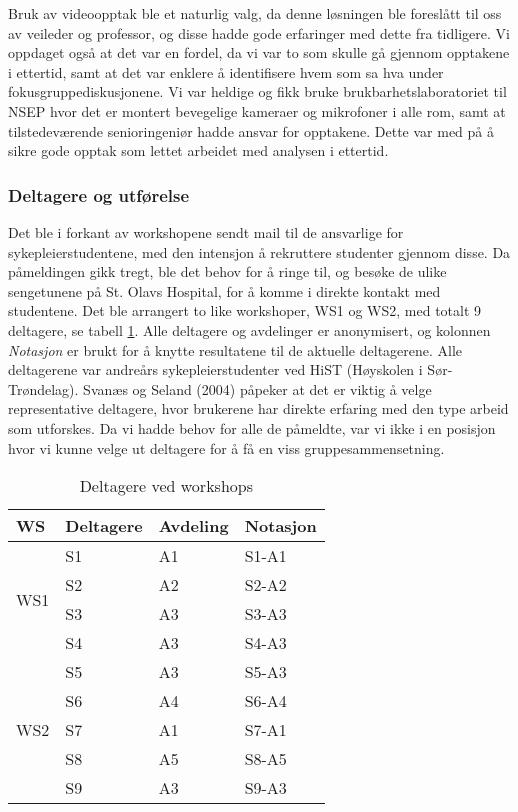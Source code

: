 \noindent
Bruk av videoopptak ble et naturlig valg, da denne løsningen ble foreslått til oss av veileder og professor, og disse hadde gode erfaringer med dette fra tidligere. Vi oppdaget også at det var en fordel, da vi var to som skulle gå gjennom opptakene i ettertid, samt at det var enklere å identifisere hvem som sa hva under fokusgruppediskusjonene. 
Vi var heldige og fikk bruke brukbarhetslaboratoriet til NSEP hvor det er montert bevegelige kameraer og mikrofoner i alle rom, samt at tilstedeværende senioringeniør hadde ansvar for opptakene. Dette var med på å sikre gode opptak som lettet arbeidet med analysen i ettertid.

\subsubsection{Deltagere og utførelse}
\label{deltagere}
Det ble i forkant av workshopene sendt mail til de ansvarlige for sykepleierstudentene, med den intensjon å rekruttere studenter gjennom disse. Da påmeldingen gikk tregt, ble det behov for å ringe til, og besøke de ulike sengetunene på St. Olavs Hospital, for å komme i direkte kontakt med studentene. 
Det ble arrangert to like workshoper, WS1 og WS2, med totalt 9 deltagere, se tabell \ref{Deltagere_WS}. Alle deltagere og avdelinger er anonymisert, og kolonnen \emph{Notasjon} er brukt for å knytte resultatene til de aktuelle deltagerene. Alle deltagerene var andreårs sykepleierstudenter ved HiST (Høyskolen i Sør-Trøndelag). Svanæs og Seland (2004) påpeker at det er viktig å velge representative deltagere, hvor brukerene har direkte erfaring med den type arbeid som utforskes. Da vi hadde behov for alle de påmeldte, var vi ikke i en posisjon hvor vi kunne velge ut deltagere for å få en viss gruppesammensetning. 

\begin{table}[H]
\centering
\begin{tabular}{ |l|l|l|l| }
\hline
WS & Deltagere & Avdeling & Notasjon \\ \hline
\multirow{4}{*}{WS1} & S1 & A1 & S1-A1 \\
 & S2 & A2 & S2-A2 \\
 & S3 & A3 & S3-A3 \\
 & S4 & A3 & S4-A3 \\ \hline
\multirow{5}{*}{WS2} & S5 & A3 & S5-A3 \\
 & S6 & A4 & S6-A4 \\
 & S7 & A1 & S7-A1 \\
 & S8 & A5 & S8-A5 \\
 & S9 & A3 & S9-A3 \\ 
\hline
\end{tabular}
\label{Deltagere_WS}
\caption{Deltagere ved workshops}
\end{table}

